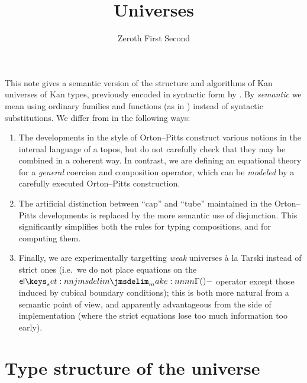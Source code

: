 \documentclass[draft]{amsart}
\title{Universes}
\author{Zeroth First Second}
\begin{document}
\maketitle

This note gives a semantic version of the structure and algorithms of Kan
universes of Kan types, previously encoded in syntactic form by
\citet{angiuli:2019}. By \emph{semantic} we mean using ordinary families and
functions (as in \citep{orton-pitts:2016,abcfhl:2019}) instead of syntactic
substitutions. We differ from \citep{orton-pitts:2016,abcfhl:2019} in the
following ways:

\begin{enumerate}

  \item The developments in the style of Orton--Pitts construct various notions
    in the internal language of a topos, but do not carefully check that they
    may be combined in a coherent way. In contrast, we are defining an
    equational theory for a \emph{general} coercion and composition operator,
    which can be \emph{modeled} by a carefully executed Orton--Pitts
    construction.

  \item The artificial distinction between ``cap'' and ``tube'' maintained in
    the Orton--Pitts developments is replaced by the more semantic use of
    disjunction. This significantly simplifies both the rules for typing
    compositions, and for computing them.

  \item Finally, we are experimentally targetting \emph{weak} universes \`a la
    Tarski instead of strict ones (i.e.\ we do not place equations on the
    $\TpEl{-}$ operator except those induced by cubical boundary conditions);
    this is both more natural from a semantic point of view, and apparently
    advantageous from the side of implementation (where the strict equations
    lose too much information too early).

\end{enumerate}


\section{Type structure of the universe}
\end{document}
